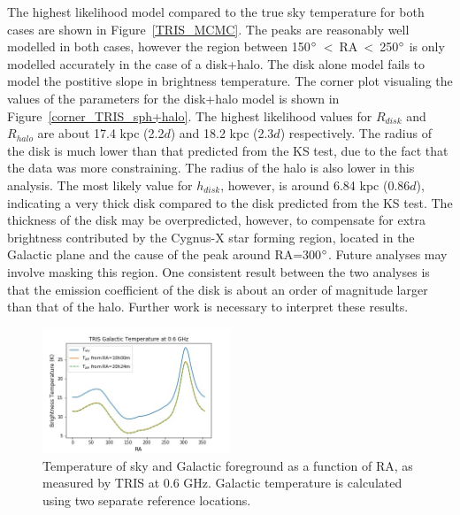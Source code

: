 \documentclass[%
onecolumn,
11pt,
tightenlines,
notitlepage,
superscriptaddress,
nofootinbib,
amsmath,amssymb,
aps,
pra,
]{revtex4-1}
\begin{document}
The highest likelihood model compared to the true sky temperature for both cases are shown in Figure~\ref{TRIS_MCMC}. The peaks are reasonably well modelled in both cases, however the region between 150$\degree$~<~RA~<~250$\degree$ is only modelled accurately in the case of a disk+halo. The disk alone model fails to model the postitive slope in brightness temperature. The corner plot visualing the values of the parameters for the disk+halo model is shown in Figure~\ref{corner_TRIS_sph+halo}. The highest likelihood values for $R_{disk}$ and $R_{halo}$ are about 17.4 kpc (2.2$d$) and 18.2 kpc (2.3$d$) respectively. The radius of the disk is much lower than that predicted from the KS test, due to the fact that the data was more constraining. The radius of the halo is also lower in this analysis. The most likely value for $h_{disk}$, however, is around 6.84 kpc (0.86$d$), indicating a very thick disk compared to the disk predicted from the KS test. The thickness of the disk may be overpredicted, however, to compensate for extra brightness contributed by the Cygnus-X star forming region, located in the Galactic plane and the cause of the peak around RA=300$\degree$. Future analyses may involve masking this region. One consistent result between the two analyses is that the emission coefficient of the disk is about an order of magnitude larger than that of the halo. Further work is necessary to interpret these results.

\begin{figure}[H]
\begin{center}
\includegraphics[width=0.5\textwidth]{TRIS_Tgal.jpg}
\caption{Temperature of sky and Galactic foreground as a function of RA, as measured by TRIS at 0.6 GHz. Galactic temperature is calculated using two separate reference locations.}
\label{TRIS_Tgal}
\end{center}
\end{figure}
\end{document}

